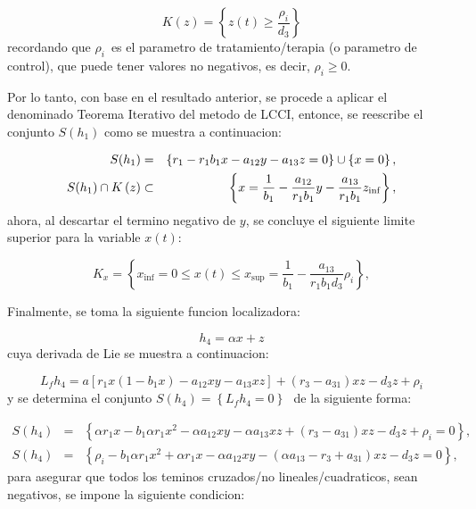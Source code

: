 \documentclass[letterpaper,11pt]{article}
\begin{document}
\begin{equation*}
K\left( z\right) =\left\{ z\left( t\right) \geq \frac{\rho _{i}}{d_{3}}%
\right\} 
\end{equation*}%
recordando que $\rho _{i}$\bigskip\ es el parametro de tratamiento/terapia
(o parametro de control), que puede tener valores no negativos, es decir, $%
\rho _{i}\geq 0$.

Por lo tanto, con base en el resultado anterior, se procede a aplicar el
denominado Teorema Iterativo del metodo de LCCI, entonce, se reescribe el
conjunto $S\left( h_{1}\right) $ como se muestra a continuacion:

\begin{eqnarray*}
S(h_{1}) &=&\left\{ r_{1}-r_{1}b_{1}x-a_{12}y-a_{13}z=0\right\} \cup \left\{
x=0\right\} , \\
S(h_{1})\cap K\left( z\right)  &\subset &\left\{ x=\frac{1}{b_{1}}-\frac{%
a_{12}}{r_{1}b_{1}}y-\frac{a_{13}}{r_{1}b_{1}}z_{\inf }\right\} ,
\end{eqnarray*}%
ahora, al descartar el termino negativo de $y$, se concluye el siguiente
limite superior para la variable $x\left( t\right) $:

\begin{equation*}
K_{x}=\left\{ x_{\inf }=0\leq x\left( t\right) \leq x_{\sup }=\frac{1}{b_{1}}%
-\frac{a_{13}}{r_{1}b_{1}d_{3}}\rho _{i}\right\} ,
\end{equation*}

Finalmente, se toma la siguiente funcion localizadora:

\begin{equation*}
h_{4}=\alpha x+z
\end{equation*}%
cuya derivada de Lie se muestra a continuacion:

\begin{equation*}
L_{f}h_{4}=a\left[ r_{1}x(1-b_{1}x)-a_{12}xy-a_{13}xz\right] +\left(
r_{3}-a_{31}\right) xz-d_{3}z+\rho _{i}
\end{equation*}%
y se determina el conjunto $S\left( h_{4}\right) =\left\{
L_{f}h_{4}=0\right\} \,$\ de la siguiente forma:

\begin{eqnarray*}
S\left( h_{4}\right)  &=&\left\{ \alpha r_{1}x-b_{1}\alpha r_{1}x^{2}-\alpha
a_{12}xy-\alpha a_{13}xz+\left( r_{3}-a_{31}\right) xz-d_{3}z+\rho
_{i}=0\right\} , \\
S\left( h_{4}\right)  &=&\left\{ \rho _{i}-b_{1}\alpha r_{1}x^{2}+\alpha
r_{1}x-\alpha a_{12}xy-\left( \alpha a_{13}-r_{3}+a_{31}\right)
xz-d_{3}z=0\right\} ,
\end{eqnarray*}%
para asegurar que todos los teminos cruzados/no lineales/cuadraticos, sean
negativos, se impone la siguiente condicion:
\end{document}
